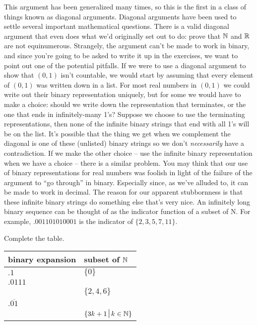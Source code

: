 This argument has been generalized many times, so this is the first in a
class of things known as diagonal arguments.  Diagonal arguments have been
used to settle several important mathematical questions.  There is a valid
diagonal argument that even does what we'd originally set out to do: prove
that ${\mathbb N}$  and ${\mathbb R}$ are not equinumerous.  Strangely, the 
argument can't be made to work in binary, and since you're going to be 
asked to write it up in the exercises, we want to point out one of the 
potential pitfalls.
If we were to use a diagonal argument to show that $(0, 1)$ isn't countable,
we would start by assuming that every element of $(0, 1)$ was written down in
a list.  For most real numbers in $(0, 1)$ we could write out their 
binary representation uniquely, but for some we would have to make a 
choice: should we write down the representation that terminates, or 
the one that ends in infinitely-many 1's?  Suppose we choose to use 
the terminating representations, then none of the infinite binary 
strings that end with all 1's will be on the list.  It's possible that 
the thing we get when we complement the diagonal
is one of these (unlisted) binary strings so we don't \emph{necessarily} 
have a contradiction.
If we make the other choice -- use the infinite binary representation
when we have a choice -- there is a similar problem.
You may think that our use of binary representations for real numbers
was foolish in light of the failure of the argument to ``go through'' 
in binary.
Especially since, as we've alluded to, it can be made to work in decimal.
The reason for our apparent stubbornness is that these infinite binary
strings do something else that's very nice.  An infinitely long binary sequence
can be thought of as the indicator function of a subset of N.  For example,
$.001101010001$ is the indicator of $\{2, 3, 5, 7, 11\}$.

\begin{exer} 

Complete the table.
\medskip

\begin{center}
\begin{tabular}{l|l}
binary expansion & subset of ${\mathbb N}$ \\ \hline\hline
\rule[-4pt]{0pt}{20pt} $.1$ & $\{0\}$ \\\hline
\rule[-4pt]{0pt}{20pt}$.0111$ &   \\\hline
\rule[-4pt]{0pt}{20pt} & $\{2, 4, 6\}$ \\\hline
\rule[-4pt]{0pt}{20pt}$.\overline{01}$ & \\\hline
\rule[-4pt]{0pt}{20pt} & $\{3k + 1 \suchthat k \in \Naturals\}$ \\
\end{tabular}
\end{center}

\end{exer}


